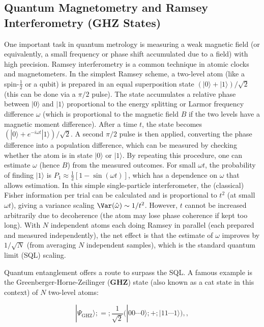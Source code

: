 \subsection{Quantum Magnetometry and Ramsey Interferometry (GHZ States)}

\label{sec:GHZ-Ramsey}



One important task in quantum metrology is measuring a weak magnetic field (or equivalently, a small frequency or phase shift accumulated due to a field) with high precision. Ramsey interferometry is a common technique in atomic clocks and magnetometers. In the simplest Ramsey scheme, a two-level atom (like a spin-$\frac{1}{2}$ or a qubit) is prepared in an equal superposition state $(|0\rangle + |1\rangle)/\sqrt{2}$ (this can be done via a $\pi/2$ pulse). The state accumulates a relative phase between $|0\rangle$ and $|1\rangle$ proportional to the energy splitting or Larmor frequency difference $\omega$ (which is proportional to the magnetic field $B$ if the two levels have a magnetic moment difference). After a time $t$, the state becomes $(|0\rangle + e^{-i\omega t}|1\rangle)/\sqrt{2}$. A second $\pi/2$ pulse is then applied, converting the phase difference into a population difference, which can be measured by checking whether the atom is in state $|0\rangle$ or $|1\rangle$. By repeating this procedure, one can estimate $\omega$ (hence $B$) from the measured outcomes. For small $\omega t$, the probability of finding $|1\rangle$ is $P_1 \approx \frac{1}{2}[1 - \sin(\omega t)]$, which has a dependence on $\omega$ that allows estimation. In this simple single-particle interferometer, the (classical) Fisher information per trial can be calculated and is proportional to $t^2$ (at small $\omega t$), giving a variance scaling $\Var(\hat{\omega}) \sim 1/t^2$. However, $t$ cannot be increased arbitrarily due to decoherence (the atom may lose phase coherence if kept too long). With $N$ independent atoms each doing Ramsey in parallel (each prepared and measured independently), the net effect is that the estimate of $\omega$ improves by $1/\sqrt{N}$ (from averaging $N$ independent samples), which is the standard quantum limit (SQL) scaling.



Quantum entanglement offers a route to surpass the SQL. A famous example is the Greenberger-Horne-Zeilinger (\textbf{GHZ}) state (also known as a cat state in this context) of $N$ two-level atoms:

\begin{equation}

|\Psi_{\text{GHZ}}\rangle ;=; \frac{1}{\sqrt{2}}\Big(|0 0 \cdots 0\rangle ;+; |1 1 \cdots 1\rangle\Big) ,,

\label{eq:GHZ-state}

\end{equation}

